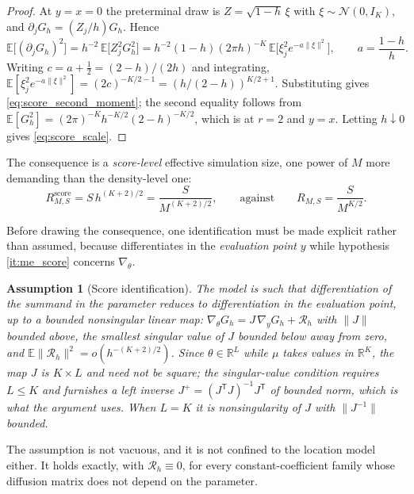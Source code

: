 \documentclass[11pt]{article}
\newtheorem{assumption}[assumption]{Assumption}
\theoremstyle{definition}
\newcommand{\R}{\mathbb{R}}
\newcommand{\E}{\mathbb{E}}
\newcommand{\Rem}{\mathcal{R}}
\newcommand{\Normal}{\mathcal{N}}
\begin{document}
\begin{proof}
At $y=x=0$ the preterminal draw is $Z=\sqrt{1-h}\,\xi$ with $\xi\sim\Normal(0,I_K)$, and $\partial_jG_h=(Z_j/h)G_h$. Hence
\[
\E\bigl[(\partial_jG_h)^2\bigr]=h^{-2}\,\E\bigl[Z_j^2G_h^2\bigr]
=h^{-2}(1-h)(2\pi h)^{-K}\,\E\bigl[\xi_j^2e^{-a\lVert\xi\rVert^2}\bigr],
\qquad a=\frac{1-h}{h}.
\]
Writing $c=a+\tfrac12=(2-h)/(2h)$ and integrating,
$\E[\xi_j^2e^{-a\lVert\xi\rVert^2}]=(2c)^{-K/2-1}=(h/(2-h))^{K/2+1}$.
Substituting gives \eqref{eq:score_second_moment}; the second equality follows from $\E[G_h^2]=(2\pi)^{-K}h^{-K/2}(2-h)^{-K/2}$, which is  at $r=2$ and $y=x$. Letting $h\downarrow0$ gives \eqref{eq:score_scale}.
\end{proof}

The consequence is a \emph{score-level} effective simulation size, one power of $M$ more demanding than the density-level one:
\begin{equation}\label{eq:score_effective_size}
R^{\mathrm{score}}_{M,S}=S\,h^{(K+2)/2}=\frac{S}{M^{(K+2)/2}},
\qquad\text{against}\qquad
R_{M,S}=\frac{S}{M^{K/2}}.
\end{equation}

Before drawing the consequence, one identification must be made explicit rather than assumed, because  differentiates in the \emph{evaluation point} $y$ while hypothesis \ref{it:me_score} concerns $\nabla_\theta$.

\begin{assumption}[Score identification]\label{ass:score_identification}
The model is such that differentiation of the summand in the parameter reduces to differentiation in the evaluation point, up to a bounded nonsingular linear map: $\nabla_\theta G_h=J\,\nabla_yG_h+\Rem_h$ with $\lVert J\rVert$ bounded above, the smallest singular value of $J$ bounded below away from zero, and $\E\lVert\Rem_h\rVert^2=o(h^{-(K+2)/2})$. Since $\theta\in\R^L$ while $\mu$ takes values in $\R^K$, the map $J$ is $K\times L$ and need not be square; the singular-value condition requires $L\le K$ and furnishes a left inverse $J^{+}=(J^{\mathsf T}J)^{-1}J^{\mathsf T}$ of bounded norm, which is what the argument uses. When $L=K$ it is nonsingularity of $J$ with $\lVert J^{-1}\rVert$ bounded.
\end{assumption}

The assumption is not vacuous, and it is not confined to the location model either. It holds exactly, with $\Rem_h\equiv0$, for every constant-coefficient family whose diffusion matrix does not depend on the parameter.
\end{document}
